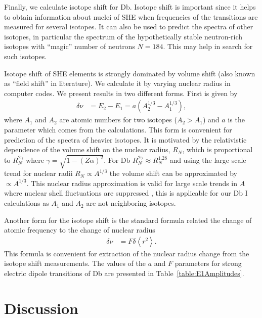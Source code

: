 \documentclass[10pt,a4paper, twoside]{report}
\begin{document}

Finally, we calculate isotope shift for Db. Isotope shift is important since it helps to obtain information about
nuclei of SHE when frequencies of the transitions are measured for several isotopes. It can also be used 
to predict the spectra of other isotopes, in particular the spectrum of the hypothetically stable neutron-rich 
isotopes with ``magic'' number of neutrons $N=184$. This may help in search for such isotopes.

Isotope shift of SHE elements is strongly dominated by volume shift (also known as ``field shift'' in literature). We calculate it by varying nuclear radius in 
computer codes. We present results in two different forms. First is given by~\cite{DFW17}
\begin{align*}
\delta \nu &= E_{2} - E_{1} = a\left(A_{2}^{1/3} - A_{1}^{1/3}\right),
\end{align*}
where $A_1$ and $A_2$ are atomic numbers for two isotopes ($A_2>A_1$) and $a$ is the parameter which
comes from the calculations. This form is convenient for prediction of the spectra of heavier isotopes. It is motivated by the relativistic dependence of the volume shift on the nuclear radius, $R_N$, which is proportional to $R_N^{2\gamma}$ where $\gamma = \sqrt{1 - (Z\alpha)^2}$. For  Db  $R_N^{ 2\gamma}  \approx R_{N}^{1.28}$ and using the large scale trend for nuclear radii $R_N \propto A^{1/3}$  the volume shift can be approximated by $\propto A^{1/3}$. This nuclear radius approximation is valid for large scale trends in $A$ where nuclear shell fluctuations are suppressed \cite{Angeli2013, DFW17}, this is applicable for our Db I calculations as $A_1$ and $A_2$ are not neighboring isotopes.

Another form for the isotope shift is the standard formula related the change of atomic frequency to the change
of nuclear radius
\begin{align*}
\delta \nu &= F\delta \left<r^{2}\right>.
\end{align*}
This formula is convenient for extraction of the nuclear radius change from the isotope shift measurements.
The values of the $a$ and $F$ parameters for strong electric dipole transitions of Db are presented in 
Table~\ref{table:E1Amplitudes}.
\section{Discussion}
\end{document}
